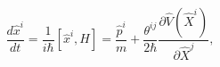 \begin{equation}
\frac{d\hat{x}^{i}}{dt}=\frac{1}{i\hbar}[\hat{x}^{i},H]=\frac{\hat{p}^{i}}%
{m}+\frac{\theta^{ij}}{2\hbar}\frac{\partial\widehat{V}(\widehat{X}^{i}%
)}{\partial\widehat{X}^{j}},\label{21}%
\end{equation}

